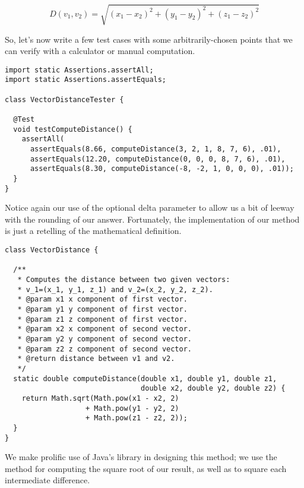 \[
D(v_1, v_2) = \sqrt{(x_1 - x_2)^2 + (y_1 - y_2)^2 + (z_1 - z_2)^2}
\]

So, let's now write a few test cases with some arbitrarily-chosen points that we can verify with a calculator or manual computation.

\begin{lstlisting}[language=MyJava]
import static Assertions.assertAll;
import static Assertions.assertEquals;

class VectorDistanceTester {

  @Test
  void testComputeDistance() {
    assertAll(
      assertEquals(8.66, computeDistance(3, 2, 1, 8, 7, 6), .01),
      assertEquals(12.20, computeDistance(0, 0, 0, 8, 7, 6), .01),
      assertEquals(8.30, computeDistance(-8, -2, 1, 0, 0, 0), .01));
  }
}
\end{lstlisting}

Notice again our use of the optional delta parameter to allow us a bit of leeway with the rounding of our answer. 
Fortunately, the implementation of our method is just a retelling of the mathematical definition.

\enlargethispage{-2\baselineskip}
\begin{lstlisting}[language=MyJava]
class VectorDistance {

  /**
   * Computes the distance between two given vectors:
   * v_1=(x_1, y_1, z_1) and v_2=(x_2, y_2, z_2).
   * @param x1 x component of first vector.
   * @param y1 y component of first vector.
   * @param z1 z component of first vector.
   * @param x2 x component of second vector.
   * @param y2 y component of second vector.
   * @param z2 z component of second vector.
   * @return distance between v1 and v2.
   */
  static double computeDistance(double x1, double y1, double z1, 
                                double x2, double y2, double z2) {
    return Math.sqrt(Math.pow(x1 - x2, 2) 
                   + Math.pow(y1 - y2, 2)
                   + Math.pow(z1 - z2, 2));
  }
}
\end{lstlisting}

We make prolific use of Java's  library in designing this method; we use the  method for computing the square root of our result, as well as  to square each intermediate difference.

